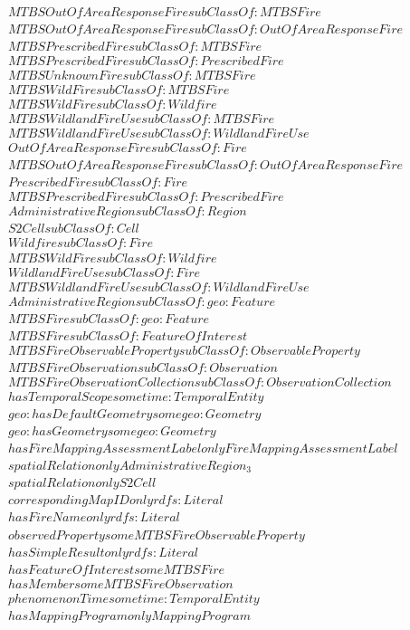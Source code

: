 \begin{align}
  MTBSOutOfAreaResponseFire subClassOf: MTBSFire\\
  MTBSOutOfAreaResponseFire subClassOf: OutOfAreaResponseFire\\
  MTBSPrescribedFire subClassOf: MTBSFire\\
  MTBSPrescribedFire subClassOf: PrescribedFire\\
  MTBSUnknownFire subClassOf: MTBSFire\\
  MTBSWildFire subClassOf: MTBSFire\\
  MTBSWildFire subClassOf: Wildfire\\
  MTBSWildlandFireUse subClassOf: MTBSFire\\
  MTBSWildlandFireUse subClassOf: WildlandFireUse\\
  OutOfAreaResponseFire subClassOf: Fire\\
  MTBSOutOfAreaResponseFire subClassOf: OutOfAreaResponseFire\\
  PrescribedFire subClassOf: Fire\\
  MTBSPrescribedFire subClassOf: PrescribedFire\\
  AdministrativeRegion subClassOf: Region\\
  S2Cell subClassOf: Cell\\
  Wildfire subClassOf: Fire\\
  MTBSWildFire subClassOf: Wildfire\\
  WildlandFireUse subClassOf: Fire\\
  MTBSWildlandFireUse subClassOf: WildlandFireUse\\
  AdministrativeRegion subClassOf: geo:Feature\\
  MTBSFire subClassOf: geo:Feature\\
  MTBSFire subClassOf: FeatureOfInterest\\
  MTBSFireObservableProperty subClassOf: ObservableProperty\\
  MTBSFireObservation subClassOf: Observation\\
  MTBSFireObservationCollection subClassOf: ObservationCollection\\
  hasTemporalScope some time:TemporalEntity \\
  geo:hasDefaultGeometry some geo:Geometry \\
  geo:hasGeometry some geo:Geometry \\
  hasFireMappingAssessmentLabel only FireMappingAssessmentLabel \\
  spatialRelation only AdministrativeRegion_3 \\
  spatialRelation only S2Cell \\
  correspondingMapID only rdfs:Literal \\
  hasFireName only rdfs:Literal \\
  observedProperty some MTBSFireObservableProperty \\
  hasSimpleResult only rdfs:Literal \\
  hasFeatureOfInterest some MTBSFire \\
  hasMember some MTBSFireObservation \\
  phenomenonTime some time:TemporalEntity \\
  hasMappingProgram only MappingProgram \end{align}


